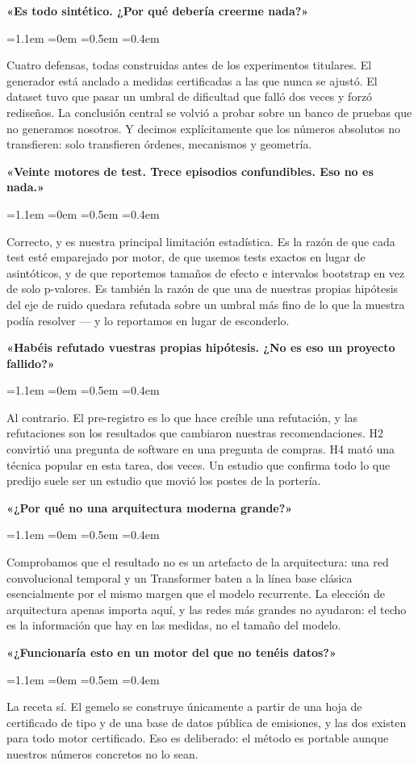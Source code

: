 \documentclass[11pt,a4paper]{article}
\newenvironment{decir}%
  {\begin{list}{}{\leftmargin=1.1em \rightmargin=0em \listparindent=0pt
       \itemindent=0pt \parsep=0.5em \topsep=0.4em}\item[]\ignorespaces}%
  {\end{list}}
\begin{document}
\textbf{\color{redc}«Es todo sintético. ¿Por qué debería creerme nada?»}
\begin{decir}
Cuatro defensas, todas construidas antes de los experimentos titulares. El
generador está anclado a medidas certificadas a las que nunca se ajustó. El dataset
tuvo que pasar un umbral de dificultad que falló dos veces y forzó rediseños. La
conclusión central se volvió a probar sobre un banco de pruebas que no generamos
nosotros. Y decimos explícitamente que los números absolutos no transfieren: solo
transfieren órdenes, mecanismos y geometría.
\end{decir}

\textbf{\color{redc}«Veinte motores de test. Trece episodios confundibles. Eso no es nada.»}
\begin{decir}
Correcto, y es nuestra principal limitación estadística. Es la razón de que cada
test esté emparejado por motor, de que usemos tests exactos en lugar de asintóticos,
y de que reportemos tamaños de efecto e intervalos bootstrap en vez de solo
p-valores. Es también la razón de que una de nuestras propias hipótesis del eje de
ruido quedara refutada sobre un umbral más fino de lo que la muestra podía resolver
--- y lo reportamos en lugar de esconderlo.
\end{decir}

\textbf{\color{redc}«Habéis refutado vuestras propias hipótesis. ¿No es eso un proyecto fallido?»}
\begin{decir}
Al contrario. El pre-registro es lo que hace creíble una refutación, y las
refutaciones son los resultados que cambiaron nuestras recomendaciones. H2
convirtió una pregunta de software en una pregunta de compras. H4 mató una técnica
popular en esta tarea, dos veces. Un estudio que confirma todo lo que predijo suele
ser un estudio que movió los postes de la portería.
\end{decir}

\textbf{\color{redc}«¿Por qué no una arquitectura moderna grande?»}
\begin{decir}
Comprobamos que el resultado no es un artefacto de la arquitectura: una red
convolucional temporal y un Transformer baten a la línea base clásica esencialmente
por el mismo margen que el modelo recurrente. La elección de arquitectura apenas
importa aquí, y las redes más grandes no ayudaron: el techo es la información que
hay en las medidas, no el tamaño del modelo.
\end{decir}

\textbf{\color{redc}«¿Funcionaría esto en un motor del que no tenéis datos?»}
\begin{decir}
La receta sí. El gemelo se construye únicamente a partir de una hoja de certificado
de tipo y de una base de datos pública de emisiones, y las dos existen para todo
motor certificado. Eso es deliberado: el método es portable aunque nuestros números
concretos no lo sean.
\end{decir}
\end{document}
